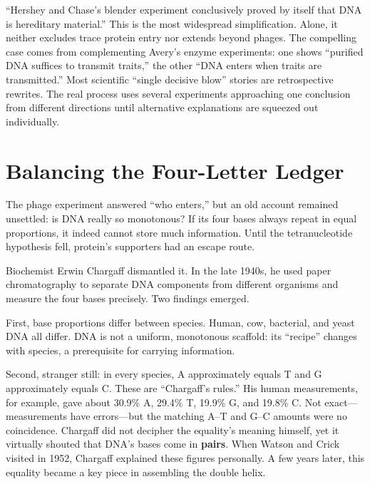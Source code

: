 \begin{wuqu}
``Hershey and Chase's blender experiment conclusively proved by itself that DNA is hereditary material.'' This is the most widespread simplification. Alone, it neither excludes trace protein entry nor extends beyond phages. The compelling case comes from complementing Avery's enzyme experiments: one shows ``purified DNA suffices to transmit traits,'' the other ``DNA enters when traits are transmitted.'' Most scientific ``single decisive blow'' stories are retrospective rewrites. The real process uses several experiments approaching one conclusion from different directions until alternative explanations are squeezed out individually.
\end{wuqu}

\section{Balancing the Four-Letter Ledger}

The phage experiment answered ``who enters,'' but an old account remained unsettled: is DNA really so monotonous? If its four bases always repeat in equal proportions, it indeed cannot store much information. Until the tetranucleotide hypothesis fell, protein's supporters had an escape route.

Biochemist Erwin Chargaff dismantled it. In the late 1940s, he used paper chromatography to separate DNA components from different organisms and measure the four bases precisely. Two findings emerged.

First, base proportions differ between species. Human, cow, bacterial, and yeast DNA all differ. DNA is not a uniform, monotonous scaffold: its ``recipe'' changes with species, a prerequisite for carrying information.

Second, stranger still: in every species, A approximately equals T and G approximately equals C. These are ``Chargaff's rules.'' His human measurements, for example, gave about 30.9\% A, 29.4\% T, 19.9\% G, and 19.8\% C. Not exact---measurements have errors---but the matching A--T and G--C amounts were no coincidence. Chargaff did not decipher the equality's meaning himself, yet it virtually shouted that DNA's bases come in \textbf{pairs}. When Watson and Crick visited in 1952, Chargaff explained these figures personally. A few years later, this equality became a key piece in assembling the double helix.

